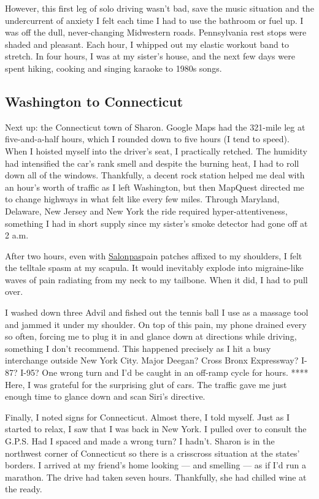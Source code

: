 However, this first leg of solo driving wasn't bad, save the music
situation and the undercurrent of anxiety I felt each time I had to use
the bathroom or fuel up. I was off the dull, never-changing Midwestern
roads. Pennsylvania rest stops were shaded and pleasant. Each hour, I
whipped out my elastic workout band to stretch. In four hours, I was at
my sister's house, and the next few days were spent hiking, cooking and
singing karaoke to 1980s songs.

\hypertarget{washington-to-connecticut}{%
\subsection{Washington to Connecticut}\label{washington-to-connecticut}}

Next up: the Connecticut town of Sharon. Google Maps had the 321-mile
leg at five-and-a-half hours, which I rounded down to five hours (I tend
to speed). When I hoisted myself into the driver's seat, I practically
retched. The humidity had intensified the car's rank smell and despite
the burning heat, I had to roll down all of the windows. Thankfully, a
decent rock station helped me deal with an hour's worth of traffic as I
left Washington, but then MapQuest directed me to change highways in
what felt like every few miles. Through Maryland, Delaware, New Jersey
and New York the ride required hyper-attentiveness, something I had in
short supply since my sister's smoke detector had gone off at 2 a.m.

After two hours, even with
\href{https://us.hisamitsu/pain-relief-products}{Salonpas}pain patches
affixed to my shoulders, I felt the telltale spasm at my scapula. It
would inevitably explode into migraine-like waves of pain radiating from
my neck to my tailbone. When it did, I had to pull over.

I washed down three Advil and fished out the tennis ball I use as a
massage tool and jammed it under my shoulder. On top of this pain, my
phone drained every so often, forcing me to plug it in and glance down
at directions while driving, something I don't recommend. This happened
precisely as I hit a busy interchange outside New York City. Major
Deegan? Cross Bronx Expressway? I-87? I-95? One wrong turn and I'd be
caught in an off-ramp cycle for hours. **** Here, I was grateful for the
surprising glut of cars. The traffic gave me just enough time to glance
down and scan Siri's directive.

Finally, I noted signs for Connecticut. Almost there, I told myself.
Just as I started to relax, I saw that I was back in New York. I pulled
over to consult the G.P.S. Had I spaced and made a wrong turn? I hadn't.
Sharon is in the northwest corner of Connecticut so there is a
crisscross situation at the states' borders. I arrived at my friend's
home looking --- and smelling --- as if I'd run a marathon. The drive
had taken seven hours. Thankfully, she had chilled wine at the ready.

